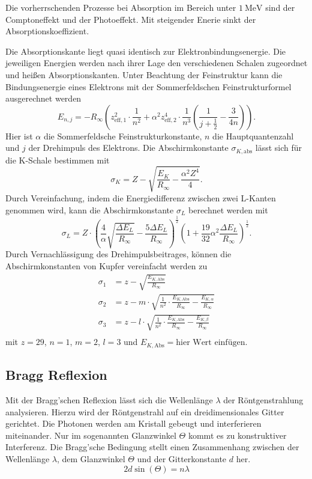 Die vorherrschenden Prozesse bei Absorption im Bereich unter $\SI{1}{\mega\eV}$ sind der Comptoneffekt und
der Photoeffekt. Mit steigender Enerie sinkt der Absorptionskoeffizient.

Die Absorptionskante liegt quasi identisch zur Elektronbindungsenergie. Die jeweiligen Energien werden nach
ihrer Lage den verschiedenen Schalen zugeordnet und heißen Absorptionskanten.
Unter Beachtung der Feinstruktur kann die Bindungsenergie eines Elektrons mit der Sommerfeldschen Feinstrukturformel
ausgerechnet werden
\begin{equation*}\label{eq:Bindungsenergie_Sommerfeld}
    E_{n,j} = -R_\infty \left(z_{\text{eff},1}^2 \cdot \frac{1}{n^2} + α^2z_{\text{eff},2}^4 \cdot \frac{1}{n^3}\left(\frac{1}{j + \frac{1}{2}} - \frac{3}{4n}\right)\right).
\end{equation*}
Hier ist $α$ die Sommerfeldsche Feinstrukturkonstante, $n$ die Hauptquantenzahl und $j$ der Drehimpuls des Elektrons.
Die Abschirmkonstante $σ_{K,\text{abs}}$ lässt sich für die K-Schale bestimmen mit
\begin{equation*}\label{eq:Abschirmkonstante_K}
    σ_K = Z - \sqrt{\frac{E_K}{R_\infty} - \frac{α^2Z^4}{4}}.
\end{equation*}
Durch Vereinfachung, indem die Energiedifferenz zwischen zwei L-Kanten genommen wird, kann die Abschirmkonstante
$σ_L$ berechnet werden mit
\begin{equation*}\label{eq:Abschirmkonstante_L}
    σ_L = Z \cdot \left(\frac{4}{α}\sqrt{\frac{ΔE_L}{R_\infty}} - \frac{5ΔE_L}{R_{\infty}}\right)^{\frac{1}{2}}\left(1 + \frac{19}{32}α^2\frac{ΔE_L}{R_{\infty}}\right)^{\frac{1}{2}}.
\end{equation*}
Durch Vernachlässigung des Drehimpulsbeitrages, können die Abschirmkonstanten von Kupfer vereinfacht werden zu
\begin{align}
    σ_1 &= z - \sqrt{\frac{E_{K,\text{Abs}}}{R_\infty}}\\
    σ_2 &= z - m \cdot \sqrt{\frac{1}{n^2} \cdot \frac{E_{K,\text{Abs}}}{R_\infty} - \frac{E_{K,α}}{R_\infty}}\\
    σ_3 &= z - l \cdot \sqrt{\frac{1}{n^2} \cdot \frac{E_{K,\text{Abs}}}{R_\infty} - \frac{E_{K,β}}{R_\infty}} \\
\end{align}
mit $z = 29$, $n = 1$, $m = 2$, $l = 3$ und $E_{K,\text{Abs}} = \text{hier Wert einfügen}$.

\subsection{Bragg Reflexion}
\label{sec:Bragg_Reflexion}
Mit der Bragg'schen Reflexion lässt sich die Wellenlänge $λ$ der Röntgenstrahlung analysieren.
Hierzu wird der Röntgenstrahl auf ein dreidimensionales Gitter gerichtet. Die Photonen werden am Kristall 
gebeugt und interferieren miteinander. Nur im sogenannten Glanzwinkel $\Theta$ kommt es zu konstruktiver Interferenz.
Die Bragg'sche Bedingung stellt einen Zusammenhang zwischen der Wellenlänge $λ$, dem Glanzwinkel $\Theta$ und der Gitterkonstante $d$ her.
\begin{equation}\label{eq:Bragg_Bedingung}
    2 d \sin(\Theta) = n λ
\end{equation}


